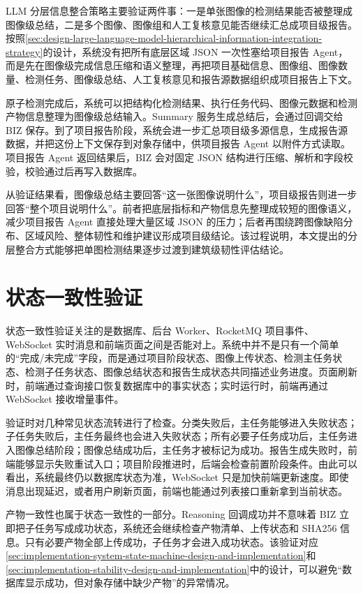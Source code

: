 LLM 分层信息整合策略主要验证两件事：一是单张图像的检测结果能否被整理成图像级总结，二是多个图像、图像组和人工复核意见能否继续汇总成项目级报告。按照\cref{sec:design-large-language-model-hierarchical-information-integration-strategy}的设计，系统没有把所有底层区域 JSON 一次性塞给项目报告 Agent，而是先在图像级完成信息压缩和语义整理，再把项目基础信息、图像组、图像数量、检测任务、图像级总结、人工复核意见和报告源数据组织成项目报告上下文。

原子检测完成后，系统可以把结构化检测结果、执行任务代码、图像元数据和检测产物信息整理为图像级总结输入。Summary 服务生成总结后，会通过回调交给 BIZ 保存。到了项目报告阶段，系统会进一步汇总项目级多源信息，生成报告源数据，并把这份上下文保存到对象存储中，供项目报告 Agent 以附件方式读取。项目报告 Agent 返回结果后，BIZ 会对固定 JSON 结构进行压缩、解析和字段校验，校验通过后再写入数据库。

从验证结果看，图像级总结主要回答“这一张图像说明什么”，项目级报告则进一步回答“整个项目说明什么”。前者把底层指标和产物信息先整理成较短的图像语义，减少项目报告 Agent 直接处理大量区域 JSON 的压力；后者再围绕跨图像缺陷分布、区域风险、整体韧性和维护建议形成项目级结论。该过程说明，本文提出的分层整合方式能够把单图检测结果逐步过渡到建筑级韧性评估结论。

\section{状态一致性验证}
\label{sec:validation-state-consistency-validation}

状态一致性验证关注的是数据库、后台 Worker、RocketMQ 项目事件、WebSocket 实时消息和前端页面之间是否能对上。系统中并不是只有一个简单的“完成/未完成”字段，而是通过项目阶段状态、图像上传状态、检测主任务状态、检测子任务状态、图像总结状态和报告生成状态共同描述业务进度。页面刷新时，前端通过查询接口恢复数据库中的事实状态；实时运行时，前端再通过 WebSocket 接收增量事件。

验证时对几种常见状态流转进行了检查。分类失败后，主任务能够进入失败状态；子任务失败后，主任务最终也会进入失败状态；所有必要子任务成功后，主任务进入图像总结阶段；图像总结成功后，主任务才被标记为成功。报告生成失败时，前端能够显示失败重试入口；项目阶段推进时，后端会检查前置阶段条件。由此可以看出，系统最终仍以数据库状态为准，WebSocket 只是加快前端更新速度。即使消息出现延迟，或者用户刷新页面，前端也能通过列表接口重新拿到当前状态。

产物一致性也属于状态一致性的一部分。Reasoning 回调成功并不意味着 BIZ 立即把子任务写成成功状态，系统还会继续检查产物清单、上传状态和 SHA256 信息。只有必要产物全部上传成功，子任务才会进入成功状态。该验证对应\cref{sec:implementation-system-state-machine-design-and-implementation}和\cref{sec:implementation-stability-design-and-implementation}中的设计，可以避免“数据库显示成功，但对象存储中缺少产物”的异常情况。

